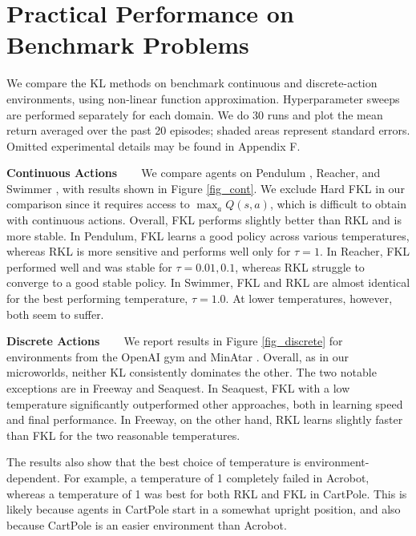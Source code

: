 \documentclass{article}
\newcommand{\myparagraph}[1]{\textbf{#1} \ \ \ }
\begin{document}
\section{Practical Performance on Benchmark Problems}
We compare the KL methods on benchmark continuous and discrete-action environments, using non-linear function approximation. Hyperparameter sweeps are performed separately for each domain. We do 30 runs and plot the mean return averaged over the past 20 episodes; shaded areas represent standard errors. Omitted experimental details may be found in Appendix F. 

\myparagraph{Continuous Actions}
We compare agents on Pendulum \citep{brockman2016openai}, Reacher, and Swimmer \citep{todorov2012mujoco}, with results shown in Figure \ref{fig_cont}. We exclude Hard FKL in our comparison since it requires access to $\max_a Q(s,a)$, which is difficult to obtain with continuous actions. Overall, FKL performs slightly better than RKL and is more stable.
In Pendulum, FKL learns a good policy across various temperatures, whereas RKL is more sensitive and performs well only for $\tau = 1$. 
In Reacher, FKL performed well and was stable for $\tau=0.01, 0.1$, whereas RKL struggle to converge to a good stable policy. 
In Swimmer, FKL and RKL are almost identical for the best performing temperature, $\tau=1.0$. At lower temperatures, however, both seem to suffer.

\myparagraph{Discrete Actions}
We report results in Figure \ref{fig_discrete} for environments from the OpenAI gym \citep{brockman2016openai} and MinAtar \citep{young2019minatar}. Overall, as in our microworlds, neither KL consistently dominates the other. The two notable exceptions are in Freeway and Seaquest. In Seaquest, FKL with a low temperature significantly outperformed other approaches, both in learning speed and final performance. In Freeway, on the other hand, RKL learns slightly faster than FKL for the two reasonable temperatures.  

The results also show that the best choice of temperature is environment-dependent. For example, a temperature of 1 completely failed in Acrobot, whereas a temperature of 1 was best for both RKL and FKL in CartPole. This is likely because agents in CartPole start in a somewhat upright position, and also because CartPole is an easier environment than Acrobot. 
\end{document}
